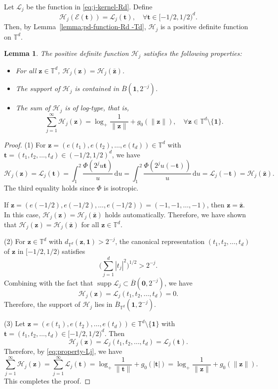\documentclass[12pt]{amsart}
\newtheorem{lemma}[theorem]{Lemma}
\theoremstyle{definition}
\theoremstyle{remark}
\newcommand{\bt}{\boldsymbol{t}}
\newcommand{\bz}{\boldsymbol{z}}
\newcommand{\T}{\mathbb{T}}
\newcommand{\supp}{\operatorname{supp}}
\numberwithin{equation}{section}
\begin{document}
Let $\mathcal{L}_j$ be the function in \eqref{eq:j-kernel-Rd}. Define
\begin{equation}\label{eq:def-Hj}
\mathcal{H}_j(\mathcal{E}(\bt))=\mathcal{L}_j(\bt),\quad \forall \bt\in [-1/2,1/2)^d.
\end{equation}
Then, by Lemma~\ref{lemma:pd-function-Rd -Td}, $\mathcal{H}_j$ is a positive definite function on $\T^d$. 
\begin{lemma}\label{lemma:properties-Hj}
	The positive definite function $\mathcal{H}_j$ satisfies the following properties:
\begin{itemize}
	\item[(1)] For all $\bz\in \T^d$, $\mathcal{H}_j(\bz)=\mathcal{H}_j(\bar{\bz})$.
    \item[(2)] The support of $\mathcal{H}_j$ is contained in $\overline{B}(\boldsymbol{1},2^{-j})$.
    \item[(3)] The sum of $\mathcal{H}_j$ is of log-type, that is,
    \[
	\sum_{j=1}^\infty \mathcal{H}_j(\bz)=\log_+\frac{1}{\|\bz\|}+g_0(\|\bz\|),\quad \forall \bz\in \T^d\setminus\{\boldsymbol{1}\}.
	\]
\end{itemize}
\end{lemma}
\begin{proof}
	(1) For $\bz=(e(t_1),e(t_2),\ldots,e(t_d))\in \T^d$ with $\bt=(t_1,t_2,\ldots,t_d)\in (-1/2,1/2)^d$, we have
	\[
	\mathcal{H}_j(\bz)=\mathcal{L}_j(\bt)=\int_1^2 \frac{\Phi(2^j u\bt)}{u}\,\mathrm{d}u=\int_1^2 \frac{\Phi(2^j u(-\bt))}{u}\,\mathrm{d}u=\mathcal{L}_j(-\bt)=\mathcal{H}_j(\bar{\bz}).
	\]
	The third equality holds since $\Phi$ is isotropic.

	If $\bz=(e(-1/2),e(-1/2),\ldots,e(-1/2))=(-1,-1,\ldots,-1)$, then $\bz=\bar{\bz}$. In this case, $\mathcal{H}_j(\bz)=\mathcal{H}_j(\bar{\bz})$ holds automatically. Therefore, we have shown that $\mathcal{H}_j(\bz)=\mathcal{H}_j(\bar{\bz})$ for all $\bz\in \T^d$.

	(2) For $\bz\in \T^d$ with $d_{\T^d}(\bz,\boldsymbol{1})>2^{-j}$, the canonical representation $(t_1,t_2,\ldots,t_d)$ of $\bz$ in $[-1/2,1/2)$ satisfies
	\[
	\bigg(\sum_{j=1}^d |t_j|^2\bigg)^{1/2}> 2^{-j}.
	\]
	Combining with the fact that $\supp \mathcal{L}_j\subset \overline{B}(\boldsymbol{0},2^{-j})$, we have 
	\[
	\mathcal{H}_j(\bz)=\mathcal{L}_j(t_1,t_2,\ldots,t_d)=0.
	\]
	Therefore, the support of $\mathcal{H}_j$ lies in $\overline{B}_{\T^d}(\boldsymbol{1},2^{-j})$.

	(3) Let $\bz=(e(t_1),e(t_2),\ldots,e(t_d))\in \T^d\setminus\{\boldsymbol{1}\}$ with $\bt=(t_1,t_2,\ldots,t_d)\in [-1/2,1/2)^d$. Then
	\[
	\mathcal{H}_j(\bz)=\mathcal{L}_j(t_1,t_2,\ldots,t_d)=\mathcal{L}_j(\bt).
	\]
	Therefore, by \eqref{eq:property-Lj}, we have
	\[
	\sum_{j=1}^\infty \mathcal{H}_j(\bz)=\sum_{j=1}^\infty \mathcal{L}_j(\bt)=\log_+ \frac{1}{\|\bt\|}+g_0(|\bt|)=\log_+ \frac{1}{\|\bz\|}+g_0(\|\bz\|).
	\]
	This completes the proof.
\end{proof}
\end{document}
